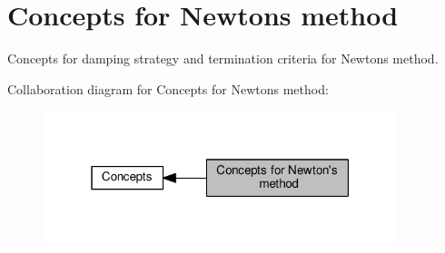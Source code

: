 \hypertarget{group__NewtonConceptGroup}{}\section{Concepts for Newton\textquotesingle{}s method}
\label{group__NewtonConceptGroup}


Concepts for damping strategy and termination criteria for Newton\textquotesingle{}s method.  


Collaboration diagram for Concepts for Newton\textquotesingle{}s method\+:\nopagebreak
\begin{figure}[H]
\begin{center}
\leavevmode
\includegraphics[width=292pt]{group__NewtonConceptGroup}
\end{center}
\end{figure}
